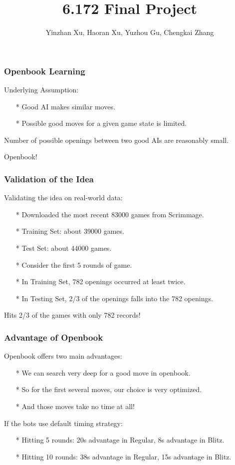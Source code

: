 \documentclass[10pt]{beamer}
\begin{document}
	\title{6.172 Final Project}
	\author{Yinzhan Xu, Haoran Xu, Yuzhou Gu, Chengkai Zhang}
	\date{}

	\begin{frame}
		\titlepage
	\end{frame}
	
	\begin{frame}
		\frametitle{Openbook Learning}
		Underlying Assumption:\pause 
		\begin{itemize}
		\item[*] Good AI makes similar moves.\pause
		\item[*] Possible good moves for a given game state is limited.\pause
		\end{itemize}
		Number of possible openings between two good AIs are reasonably small.\pause
		
		Openbook!
	\end{frame}
	
	\begin{frame}
		\frametitle{Validation of the Idea}
		Validating the idea on real-world data:\pause
		\begin{itemize}
		\item[*] Downloaded the most recent 83000 games from Scrimmage.\pause
		\item[*] Training Set: about 39000 games.\pause
		\item[*] Test Set: about 44000 games.\pause
		\item[*] Consider the first \textcolor{dred}{5} rounds of game.\pause
		\item[*] In Training Set, \textcolor{fgreen}{782} openings occurred at least \textcolor{fgreen}{twice}.\pause
		\item[*] In Testing Set, \textcolor{fgreen}{2/3} of the openings falls into the 782 openings.\pause
		\end{itemize}
		Hits \textcolor{fgreen}{2/3} of the games with only \textcolor{fgreen}{782} records!
	\end{frame}
	
	\begin{frame}
		\frametitle{Advantage of Openbook}
		Openbook offers two main advantages:\pause
		\begin{itemize}
		\item[*] We can search very deep for a good move in openbook.\pause
		\item[*] So for the first several moves, our choice is very optimized.\pause
		\item[*] And those moves take no time at all!\pause
		\end{itemize}
		If the bots use default timing strategy:\pause
		\begin{itemize}
		\item[*] Hitting \textcolor{fgreen}{5} rounds: \textcolor{fgreen}{20s} advantage in Regular, \textcolor{fgreen}{8s} advantage in Blitz.
		\item[*] Hitting \textcolor{fgreen}{10} rounds: \textcolor{fgreen}{38s} advantage in Regular, \textcolor{fgreen}{15s} advantage in Blitz.
		\end{itemize}
	\end{frame}
	
\end{document}
